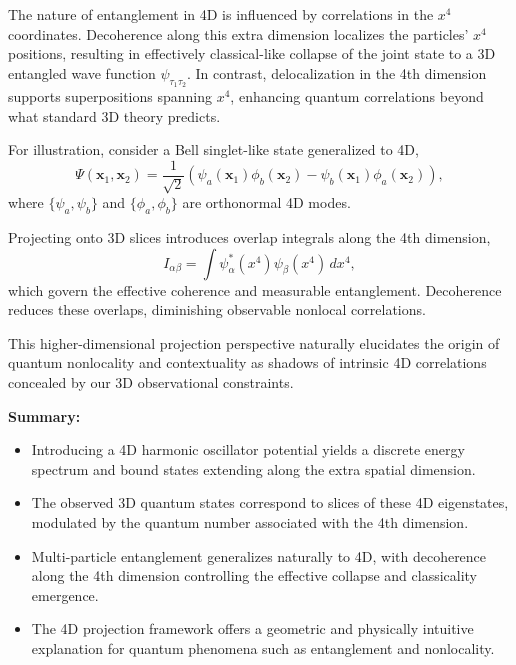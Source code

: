 \documentclass[12pt,a4paper]{article}
\numberwithin{equation}{section}
\begin{document}
The nature of entanglement in 4D is influenced by correlations in the \(x^4\) coordinates. Decoherence along this extra dimension localizes the particles’ \(x^4\) positions, resulting in effectively classical-like collapse of the joint state to a 3D entangled wave function \(\psi_{\tau_1 \tau_2}\). In contrast, delocalization in the 4th dimension supports superpositions spanning \(x^4\), enhancing quantum correlations beyond what standard 3D theory predicts.

For illustration, consider a Bell singlet-like state generalized to 4D,
\begin{equation}
    \Psi(\mathbf{x}_1, \mathbf{x}_2) = \frac{1}{\sqrt{2}} \left( \psi_a(\mathbf{x}_1) \phi_b(\mathbf{x}_2) - \psi_b(\mathbf{x}_1) \phi_a(\mathbf{x}_2) \right),
\end{equation}
where \(\{\psi_a, \psi_b\}\) and \(\{\phi_a, \phi_b\}\) are orthonormal 4D modes.

Projecting onto 3D slices introduces overlap integrals along the 4th dimension,
\begin{equation}
    I_{\alpha \beta} = \int \psi_\alpha^*(x^4) \psi_\beta(x^4) \, dx^4,
\end{equation}
which govern the effective coherence and measurable entanglement. Decoherence reduces these overlaps, diminishing observable nonlocal correlations.

This higher-dimensional projection perspective naturally elucidates the origin of quantum nonlocality and contextuality as shadows of intrinsic 4D correlations concealed by our 3D observational constraints.

\bigskip

\noindent\textbf{Summary:}
\begin{itemize}
    \item Introducing a 4D harmonic oscillator potential yields a discrete energy spectrum and bound states extending along the extra spatial dimension.
    \item The observed 3D quantum states correspond to slices of these 4D eigenstates, modulated by the quantum number associated with the 4th dimension.
    \item Multi-particle entanglement generalizes naturally to 4D, with decoherence along the 4th dimension controlling the effective collapse and classicality emergence.
    \item The 4D projection framework offers a geometric and physically intuitive explanation for quantum phenomena such as entanglement and nonlocality.
\end{itemize}
\end{document}
